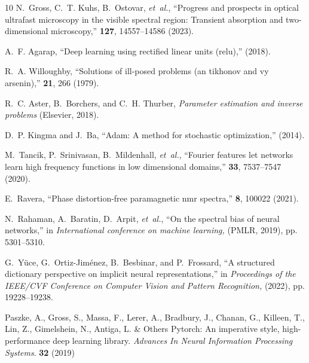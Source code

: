 \documentclass{optica-article}
\begin{document}
\begin{thebibliography}{10}
N.~Gross, C.~T. Kuhs, B.~Ostovar, \emph{et~al.}, \enquote{Progress and prospects in optical ultrafast microscopy in the visible spectral region: Transient absorption and two-dimensional microscopy,} {\protect{}} \textbf{127}, 14557--14586 (2023).

A.~F. Agarap, \enquote{Deep learning using rectified linear units (relu),} {\protect{}}  (2018).

R.~A. Willoughby, \enquote{Solutions of ill-posed problems (an tikhonov and vy arsenin),} {\protect{}} \textbf{21}, 266 (1979).

R.~C. Aster, B.~Borchers, and C.~H. Thurber, \emph{Parameter estimation and inverse problems} (Elsevier, 2018).

D.~P. Kingma and J.~Ba, \enquote{Adam: A method for stochastic optimization,} {\protect{}}  (2014).

M.~Tancik, P.~Srinivasan, B.~Mildenhall, \emph{et~al.}, \enquote{Fourier features let networks learn high frequency functions in low dimensional domains,} {\protect{}} \textbf{33}, 7537--7547 (2020).

E.~Ravera, \enquote{Phase distortion-free paramagnetic nmr spectra,} {\protect{}} \textbf{8}, 100022 (2021).

N.~Rahaman, A.~Baratin, D.~Arpit, \emph{et~al.}, \enquote{On the spectral bias of neural networks,} in \emph{International conference on machine learning,}  (PMLR, 2019), pp. 5301--5310.

G.~Y{\"u}ce, G.~Ortiz-Jim{\'e}nez, B.~Besbinar, and P.~Frossard, \enquote{A structured dictionary perspective on implicit neural representations,} in \emph{Proceedings of the IEEE/CVF Conference on Computer Vision and Pattern Recognition,}  (2022), pp. 19228--19238.

Paszke, A., Gross, S., Massa, F., Lerer, A., Bradbury, J., Chanan, G., Killeen, T., Lin, Z., Gimelshein, N., Antiga, L. \& Others Pytorch: An imperative style, high-performance deep learning library. {\em Advances In Neural Information Processing Systems}. \textbf{32} (2019)


\end{thebibliography}
\end{document}
